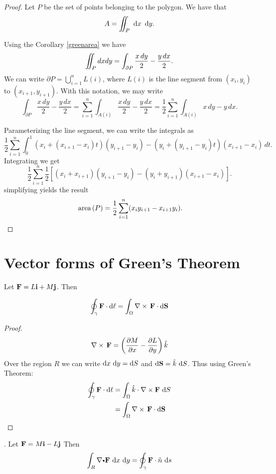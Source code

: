   \begin{proof}
   Let $P$ be the set of points belonging to the polygon. We have that \[A=\diint_{P} \dx \dy.\]
   
   Using the Corollary \ref{greenarea} we have  
   \[\displaystyle\iint_{P}dxdy=\int_{\partial P}\frac{x\,dy}{2}-\frac{y\,dx}{2}.\] 
   We can write $\partial  P=\bigcup_{i=1}^{n} L(i)$, where $L(i)$ is the line segment from $(x_i,y_i)$ to $(x_{i+1},y_{i+1})$. With this notation, we may write 
   \[\int_{\partial P}\frac{x\,dy}{2}-\frac{y\,dx}{2}=\sum_{i=1}^n\int_{A(i)}\frac{x\,dy}{2}-\frac{y\,dx}{2}=\frac{1}{2}\sum_{i=1}^n\int_{A(i)}{x\,dy}-{y\,dx}.\] 
   
   Parameterizing the line segment, we can write the integrals as
   \[\frac{1}{2}\sum_{i=1}^n\int_0^1{(x_i+(x_{i+1}-x_i)t)(y_{i+1}-y_i)}-{(y_i+(y_{i+1}-y_i)t)(x_{i+1}-x_i)\,dt}.\] Integrating  we get \[\frac{1}{2}\sum_{i=1}^n\frac{1}{2}[(x_i+x_{i+1})(y_{i+1}-y_i)- (y_{i}+y_{i+1})(x_{i+1}-x_i)].\] simplifying  yields the result
   \[\area{P}=\frac{1}{2}\sum_{i=1}^n(x_iy_{i+1}-x_{i+1}y_i).\]
  \end{proof}

  
 
\section{Vector forms of Green's Theorem}

\begin{theorem} Let 
$\mathbf{ F}= L\mathbf{ i} + M\mathbf{ j}$. Then 

\[
  \oint_\caminho \vector{F}\cdot \d \ell =
  \int_\Omega\nabla \times \,\vector{F}\cdot \d \mathbf S
\]
\end{theorem}

\begin{proof}
\[
  \nabla \times \,\mathbf{ F} = \left(\frac{\partial  M}{\partial  x} - \frac{\partial  L}{\partial  y}\right)\hat {k}
\]
Over the region $R$ we can write $\d x \,\d y = \d S$ and $\d \mathbf S = \hat {k}\,\d S$. Thus using Green's Theorem:
\begin{align*}
  \oint_\caminho \vector{F}\cdot \d \ell 
  &= \int_\Omega\hat {k}\cdot\nabla \times \vector{F}\, \d S\\
  &= \int_\Omega\nabla \times \,\vector{F}\cdot \d \mathbf S
\end{align*}
\end{proof}



\begin{theorem}. Let $\mathbf{ F}=  M\mathbf{ i} - L\mathbf{ j}$ Then 
\[
  \int_R\nabla \bp\vector{F}\,\d x\,\d y = \oint_\caminho\vector{F}\cdot \hat {n}\,\d s
\]
\end{theorem}


